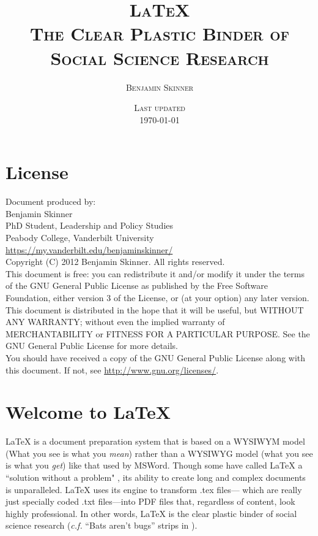 \documentclass[12pt]{article}
\title{\huge\scshape \LaTeX{} \\ {\Large The Clear Plastic Binder of Social Science Research}}\label{doc:title}
\date{{\scshape Last updated} \\ \scshape{\today}}
\author{\scshape{\Large Benjamin Skinner}}
\begin{document}
\maketitle %
\tableofcontents
\thispagestyle{empty} %
\newpage

\section*{License} %
{\parindent0pt %

Document produced by: \\

Benjamin Skinner \\
PhD Student, Leadership and Policy Studies \\
Peabody College, Vanderbilt University \\
\url{https://my.vanderbilt.edu/benjaminskinner/} \\

Copyright (C) 2012 Benjamin Skinner. All rights reserved. \\

This document is free: you can redistribute it and/or modify
it under the terms of the GNU General Public License as published by
the Free Software Foundation, either version 3 of the License, or
(at your option) any later version. \\

This document is distributed in the hope that it will be useful,
but WITHOUT ANY WARRANTY; without even the implied warranty of
MERCHANTABILITY or FITNESS FOR A PARTICULAR PURPOSE.  See the
GNU General Public License for more details. \\

You should have received a copy of the GNU General Public License
along with this document.  If not, see \url{http://www.gnu.org/licenses/}.
}

\cleardoublepage %

\section*{Welcome to \LaTeX{}} %

\LaTeX{} is a document preparation system that is based on a WYSIWYM
model (What you see is what you {\itshape mean}) rather than a WYSIWYG
model (what you see is what you {\itshape get}) like that used by MSWord. 
Though some have called \LaTeX{} a ``solution without a problem"
\cite{philosophicus1927agenda}, its ability to create long and complex 
documents is unparalleled. \LaTeX{} uses its engine to transform .tex files---
which are really just specially coded .txt files---into PDF files that,
regardless of content, look highly professional. In other words,
\LaTeX{} is the clear plastic binder of social science research 
({\itshape c.f.} ``Bats aren't bugs'' strips in \cite{watterson1992indesp}).
\end{document}
